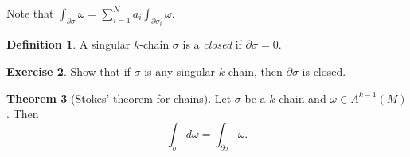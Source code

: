 \documentclass[10pt,letterpaper,cm]{nupset}
\theoremstyle{definition}
\newtheorem{definition}{Definition}[subsection]
\theoremstyle{theorem}
\newtheorem{theorem}[definition]{Theorem}
\newtheorem{exercise}[definition]{Exercise}
\theoremstyle{remark}
\newcommand{\1}{\mathbf{1}}
\newcommand{\0}{\vec 0}
\begin{document}
Note that $\int_{\partial{\sigma}}\omega = \sum_{i=1}^N a_i \int_{\partial{\sigma_i}}\omega$.

\begin{definition}
A singular $k$-chain $\sigma$ is a \textit{closed} if $\partial{\sigma}=0$.
\end{definition}

\begin{exercise}
Show that if $\sigma$ is any singular $k$-chain, then ${\partial{\sigma}}$ is closed.
\end{exercise}

\begin{theorem}[Stokes' theorem for chains]
Let $\sigma$ be a $k$-chain and $\omega \in A^{k-1}(M)$. Then $$\int_{\sigma} d\omega = \int_{\partial{\sigma}} \omega.$$
\end{theorem}
\end{document}
